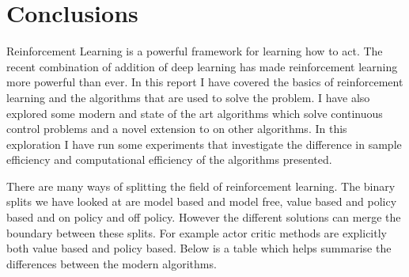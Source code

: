 \chapter{Conclusions}\label{C:con}

Reinforcement Learning is a powerful framework for learning how to act. The recent combination of addition of deep learning has made reinforcement learning more powerful than ever. In this report I have covered the basics of reinforcement learning and the algorithms that are used to solve the problem. I have also explored some modern and state of the art algorithms which solve continuous control problems and a novel extension to on other algorithms. In this exploration I have run some experiments that investigate the difference in sample efficiency and computational efficiency of the algorithms presented.

There are many ways of splitting the field of reinforcement learning. The binary splits we have looked at are model based and model free, value based and policy based and on policy and off policy. However the different solutions can merge the boundary between these splits. For example actor critic methods are explicitly both value based and policy based. Below is a table which helps summarise the differences between the modern algorithms.


